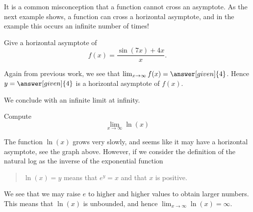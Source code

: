 \documentclass{ximera}
\begin{document}


It is a common misconception that a function cannot cross an
asymptote. As the next example shows, a function can cross a horizontal
asymptote, and in the example this occurs an infinite number of times!

\begin{example}
Give a horizontal asymptote of
\[
f(x) = \frac{\sin(7x)+4x}{x}.
\]
\begin{explanation}
Again from previous work, we see that $\lim_{x\to \infty} f(x) =
\answer[given]{4}$. Hence $y=\answer[given]{4}$ is a horizontal asymptote of $f(x)$.
\end{explanation}
\end{example}


We conclude with an infinite limit at infinity.

\begin{example}
Compute
\[
\lim_{x\to \infty} \ln(x)
\]
\begin{image}
\end{image}
\begin{explanation}
The function $\ln(x)$ grows very slowly, and seems like it may have a
horizontal asymptote, see the graph above. However, if we consider the
definition of the natural log as the inverse of the exponential
function
\begin{quote}%
  $\ln(x) = y$ means that $e^y =x$ and that $x$ is positive.
\end{quote}
We see that we may raise $e$ to higher and higher values to obtain
larger numbers.  This means that $\ln(x)$ is unbounded, and hence
$\lim_{x\to\infty}\ln(x)=\infty$.
\end{explanation}
\end{example}
\end{document}
